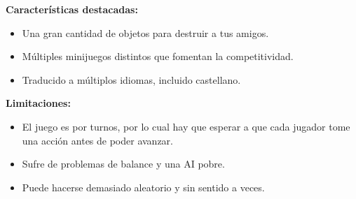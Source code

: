 \textbf{Características destacadas:}
\begin{itemize}
    \item Una gran cantidad de objetos para destruir a tus amigos.
    \item Múltiples minijuegos distintos que fomentan la competitividad.
    \item Traducido a múltiplos idiomas, incluido castellano.
\end{itemize}

\textbf{Limitaciones:}
\begin{itemize}
    \item El juego es por turnos, por lo cual hay que esperar a que cada jugador
    tome una acción antes de poder avanzar.
    \item Sufre de problemas de balance y una AI pobre.
    \item Puede hacerse demasiado aleatorio y sin sentido a veces.
\end{itemize}
